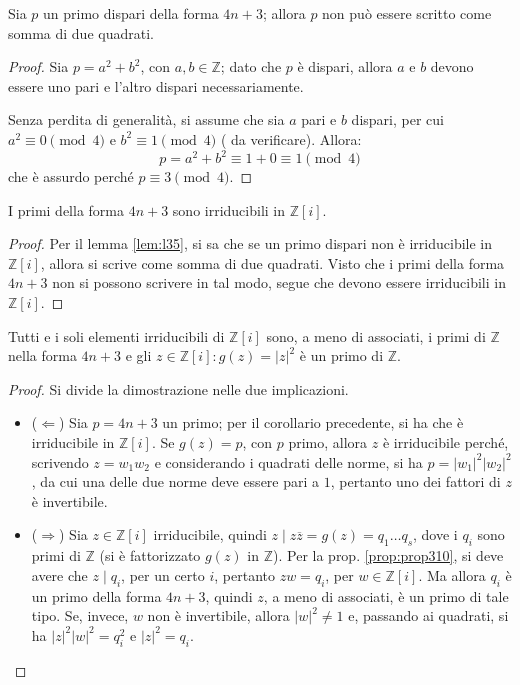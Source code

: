 \documentclass[11pt, a4paper]{scrartcl}
\theoremstyle{definition}
\numberwithin{esempio}{section}
\theoremstyle{definition}
\numberwithin{obs}{section}
\numberwithin{nota}{section}
\numberwithin{equation}{subsection}
\begin{document}
\begin{teorema}
	{}{}
	Sia $p$ un primo dispari della forma $4n +3$; allora $p$ non pu\`o essere scritto come somma di due quadrati.
	\begin{proof}
		Sia $p = a^2 + b^2$, con $a,b \in \mathbb{Z}$; dato che $p$ \`e dispari, allora $a$ e $b$ devono essere uno pari e l'altro dispari necessariamente.
		
		Senza perdita di generalit\`a, si assume che sia $a$ pari e $b $ dispari, per cui $a^2 \equiv 0 \pmod{4}$ e $b^2 \equiv 1 \pmod{4} $ ({\color{red} da verificare}). 
		Allora:
		\[
		p = a^2 + b^2 \equiv 1 + 0 \equiv 1 \pmod{4} 
		\] 
		che \`e assurdo perch\'e $p\equiv 3 \pmod{4} $.
	\end{proof}
\end{teorema}
\begin{corollario}
	{}{}
	I primi della forma $4n +3 $ sono irriducibili in $\mathbb{Z}[i]$.
	\begin{proof}
		Per il lemma \ref{lem:l35}, si sa che se un primo dispari non \`e irriducibile in $\mathbb{Z}[i]$, allora si scrive come somma di due quadrati.
		Visto che i primi della forma $4n + 3$ non si possono scrivere in tal modo, segue che devono essere irriducibili in $\mathbb{Z}[i]$.
	\end{proof}
\end{corollario}
\begin{teorema}
	{}{}
	Tutti e i soli elementi irriducibili di $\mathbb{Z}[i]$ sono, a meno di associati, i primi di $\mathbb{Z}$ nella forma $4n+3$ e gli $z \in \mathbb{Z}[i]: g(z) = \lvert z \rvert ^2$ \`e un primo di $\mathbb{Z}$.
	\begin{proof}
		Si divide la dimostrazione nelle due implicazioni.
		\begin{itemize}
			\item ($\Leftarrow$) Sia $p = 4n+3$ un primo; per il corollario precedente, si ha che \`e irriducibile in $\mathbb{Z}[i]$.
				Se $g(z) = p$, con $p$ primo, allora $z $ \`e irriducibile perch\'e, scrivendo $z = w_1w_2$ e considerando i quadrati delle norme, si ha $p = \lvert w_1 \rvert ^2 \lvert w_2 \rvert ^2$, da cui una delle due norme deve essere pari a $1$, pertanto uno dei fattori di $z$ \`e invertibile.
			\item ($\Rightarrow $) Sia $z \in \mathbb{Z}[i]$ irriducibile, quindi $z  \mid z \overline{z}= g(z) = q_1 \ldots q_s$, dove i $q_i$ sono primi di $\mathbb{Z}$ (si \`e fattorizzato $g(z)$ in $\mathbb{Z}$).
				Per la prop. \ref{prop:prop310}, si deve avere che $z  \mid q_i$, per un certo $i$, pertanto $zw = q_i$, per $w \in \mathbb{Z}[i]$.
				Ma allora $q_i$ \`e un primo della forma $4n + 3$, quindi $z$, a meno di associati, \`e un primo di tale tipo.
				Se, invece, $w$ non \`e invertibile, allora $\lvert w \rvert ^2 \neq 1$ e, passando ai quadrati, si ha $\lvert z \rvert ^2 \lvert w \rvert ^2 = q_i^2$ e $\lvert z \rvert ^2= q_i$.
		\end{itemize}
	\end{proof}
\end{teorema}
\end{document}
